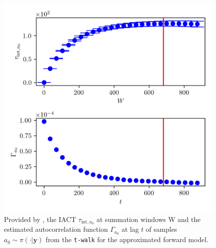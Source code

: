\begin{figure}[ht!]
	\centering
	\includegraphics{UwerrTauIntTWalk9.png}
	\caption[IACT and autocorrelation function of samples $a_0 \sim \pi(\cdot|\bm{y})$, for approximated model.]{Provided by \cite{drikHesse}, the IACT $\tau_{\text{int},a_0}$ at summation windows W and the estimated autocorrelation function $\Gamma_{a_0}$ at lag $t$ of samples $a_0 \sim \pi( \cdot| \bm{y})$ from the \texttt{t-walk} for the approximated forward model.}
\end{figure}

